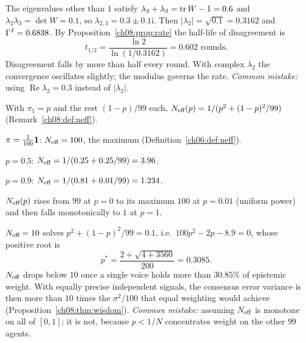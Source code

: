 \documentclass[../solutions_manual.tex]{subfiles}
\begin{document}
 The eigenvalues other than $1$ satisfy $\lambda_2 + \lambda_3 = \operatorname{tr} W - 1 = 0.6$ and $\lambda_2\lambda_3 = \det W = 0.1$, so $\lambda_{2,3} = 0.3 \pm 0.1\mathrm{i}$. Then $|\lambda_2| = \sqrt{0.1} = 0.3162$ and $\Gamma^I = 0.6838$. By Proposition~\ref{ch08:prop:rate} the half-life of disagreement is
\[
t_{1/2} = \frac{\ln 2}{\ln(1/0.3162)} = 0.602 \text{ rounds}.
\]
Disagreement falls by more than half every round. With complex $\lambda_2$ the convergence oscillates slightly; the modulus governs the rate. \emph{Common mistake:} using $\operatorname{Re}\lambda_2 = 0.3$ instead of $|\lambda_2|$.


With $\pi_1 = p$ and the rest $(1-p)/99$ each, $N_{\text{eff}}(p) = 1/(p^2 + (1-p)^2/99)$ (Remark~\ref{ch08:def:neff}).

 $\pi = \frac{1}{100}\mathbf{1}$: $N_{\text{eff}} = 100$, the maximum (Definition~\ref{ch06:def:neff}).

 $p = 0.5$: $N_{\text{eff}} = 1/(0.25 + 0.25/99) = 3.96$.

 $p = 0.9$: $N_{\text{eff}} = 1/(0.81 + 0.01/99) = 1.234$.

 $N_{\text{eff}}(p)$ rises from $99$ at $p = 0$ to its maximum $100$ at $p = 0.01$ (uniform power) and then falls monotonically to $1$ at $p = 1$.
\begin{center}
\end{center}
$N_{\text{eff}} = 10$ solves $p^2 + (1-p)^2/99 = 0.1$, i.e.\ $100p^2 - 2p - 8.9 = 0$, whose positive root is
\[
p^* = \frac{2 + \sqrt{4 + 3560}}{200} = 0.3085 .
\]
$N_{\text{eff}}$ drops below $10$ once a single voice holds more than $30.85\%$ of epistemic weight. With equally precise independent signals, the consensus error variance is then more than $10$ times the $\sigma^2/100$ that equal weighting would achieve (Proposition~\ref{ch08:thm:wisdom}). \emph{Common mistake:} assuming $N_{\text{eff}}$ is monotone on all of $[0,1]$; it is not, because $p < 1/N$ concentrates weight on the other $99$ agents.
\end{document}

